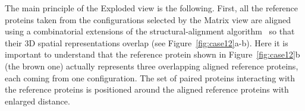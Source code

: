 \documentclass{bmcart}
\def\ExpView {Exploded view\xspace}
\def\MatView {Matrix view\xspace}
\begin{document}


The main principle of the \ExpView is the following.
First, all the reference proteins taken from the configurations selected by the \MatView are aligned using a combinatorial extensions of the structural-alignment algorithm~\cite{Shindyalov1998} so that their 3D spatial representations overlap (see Figure~\ref{fig:case12}a-b). 
Here it is important to understand that the reference protein shown in Figure~\ref{fig:case12}b (the brown one) actually represents three overlapping aligned reference proteins, each coming from one configuration.
The set of paired proteins interacting with the reference proteins is positioned around the aligned reference proteins with enlarged distance.

\end{document}
